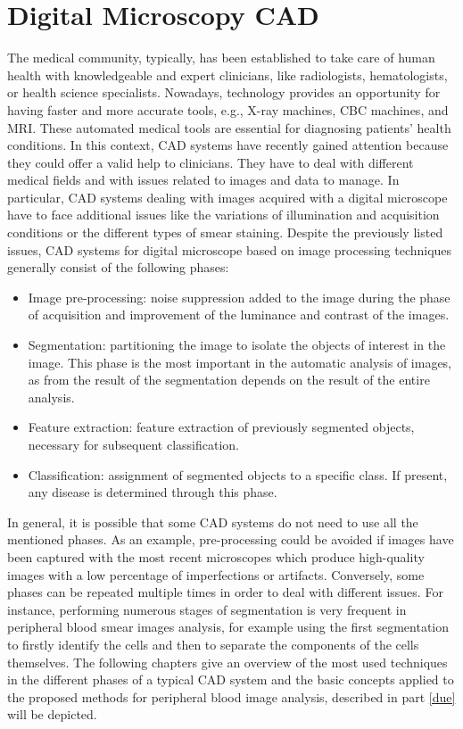 \documentclass[final,a4paper,12pt,english]{UnicaPhdThesis3}
\begin{document}
\part{Digital Microscopy CAD} \label{uno}
The medical community, typically, has been established to take care of human health with knowledgeable and expert clinicians, like radiologists, hematologists, or health science specialists. Nowadays, technology provides an opportunity for having faster and more accurate tools, e.g., X-ray machines, CBC machines, and MRI. These automated medical tools are essential for diagnosing patients' health conditions. In this context, CAD systems have recently gained attention because they could offer a valid help to clinicians. They have to deal with different medical fields and with issues related to images and data to manage. In particular, CAD systems dealing with images acquired with a digital microscope have to face additional issues like the variations of illumination and acquisition conditions or the different types of smear staining. Despite the previously listed issues, CAD systems for digital microscope based on image processing techniques generally consist of the following phases:
\begin{itemize}
	\item Image pre-processing: noise suppression added to the image during the phase of acquisition and improvement of the luminance and contrast of the images.
	\item Segmentation: partitioning the image to isolate the objects of interest in the image. This phase is the most important in the automatic analysis of images, as from the result of the segmentation depends on the result of the entire analysis.
	\item Feature extraction: feature extraction of previously segmented objects, necessary for subsequent classification.
	\item Classification: assignment of segmented objects to a specific class. If present, any disease is determined through this phase.
\end{itemize}

In general, it is possible that some CAD systems do not need to use all the mentioned phases. As an example, pre-processing could be avoided if images have been captured with the most recent microscopes which produce high-quality images with a low percentage of imperfections or artifacts. Conversely, some phases can be repeated multiple times in order to deal with different issues. For instance, performing numerous stages of segmentation is very frequent in peripheral blood smear images analysis, for example using the first segmentation to firstly identify the cells and then to separate the components of the cells themselves. 
The following chapters give an overview of the most used techniques in the different phases of a typical CAD system and the basic concepts applied to the proposed methods for peripheral blood image analysis, described in part \ref{due} will be depicted.
\end{document}
